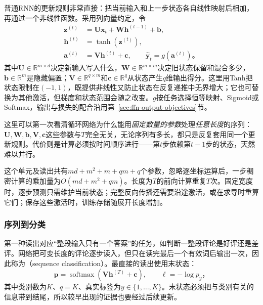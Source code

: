 普通RNN的更新规则非常直接：把当前输入和上一步状态各自线性映射后相加，再通过一个非线性函数。采用列向量约定，令
\begin{equation}
  \begin{aligned}
    \bm{z}^{(t)}&=\bm{U}\bm{x}_t+\bm{W}\bm{h}^{(t-1)}+\bm{b},\\
    \bm{h}^{(t)}&=\tanh\!\left(\bm{z}^{(t)}\right),\\
    \bm{a}^{(t)}&=\bm{V}\bm{h}^{(t)}+\bm{c},\qquad
    \widehat{\bm{y}}_t=g\!\left(\bm{a}^{(t)}\right)\text{。}
  \end{aligned}
  \label{eq:rnn-basic-cell}
\end{equation}
其中$\bm{U}\in\mathbb{R}^{m\times d}$决定新输入写入什么，$\bm{W}\in\mathbb{R}^{m\times m}$决定旧状态保留和混合多少，$\bm{b}\in\mathbb{R}^{m}$是隐藏偏置；$\bm{V}\in\mathbb{R}^{q\times m}$和$\bm{c}\in\mathbb{R}^{q}$从状态产生$q$维输出得分。这里用Tanh把状态限制在$(-1,1)$，既提供非线性又防止状态在反复递推中无界增大；它也可替换为其他激活，但梯度和状态范围会随之改变。$g$按任务选择恒等映射、Sigmoid或Softmax，输出与损失的配合沿用第~\ref{sec:ffn-output-objectives}节。

这里可以第一次看清循环网络为什么能用\emph{固定数量的参数}处理\emph{任意长度}的序列：$\bm U,\bm W,\bm b,\bm V,\bm c$这些参数与$T$完全无关，无论序列有多长，都只是反复套用同一个更新规则。代价则是计算必须按时间顺序进行——第$t$步依赖第$t-1$步的状态，天然难以并行。

这个单元及读出共有$md+m^2+m+qm+q$个参数，忽略逐坐标运算后，一步稠密计算的乘加量为$O(md+m^2+qm)$。长度为$T$的前向计算重复$T$次。固定宽度时，逐步预测只需维护当前状态；完整反向传播还需要沿途激活，或在求导时重算它们；保存这些激活时，训练存储随展开长度增加。

\subsubsection{序列到分类}
\label{sec:rnn-sequence-classification}

第一种读出对应“整段输入只有一个答案”的任务，如判断一整段评论是好评还是差评。网络把可变长度的评论逐步读入，但只在读完最后一个有效词后输出一次，因此称为（sequence classification）。最直接的读出使用末状态：
\begin{equation}
  \bm{p}=\operatorname{softmax}\!\left(\bm{V}\bm{h}^{(T)}+\bm{c}\right),
  \qquad \ell=-\log p_y\text{，}
  \label{eq:rnn-classification}
\end{equation}
其中类别数为$K$、$q=K$、真实标签为$y\in\{1,\ldots,K\}$。末状态必须把与类别有关的信息带到结尾，所以较早出现的证据也要经过后续更新。

